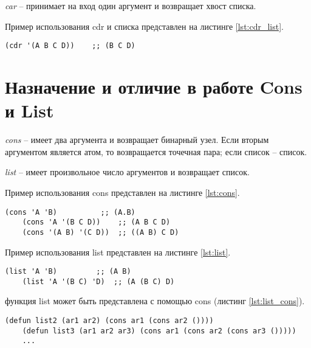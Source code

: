 \textit{car} -- принимает на вход один аргумент и возвращает хвост списка.

Пример использования cdr и списка представлен на листинге \ref{lst:cdr_list}. 

\begin{lstlisting}[label=lst:cdr_list, caption=Использование cdr и списка.]
	(cdr '(A B C D))    ;; (B C D)
\end{lstlisting}

\section{Назначение и отличие в работе Cons и List}
\textit{cons} -- имеет два аргумента и возвращает бинарный узел. Если вторым аргументом является атом, то возвращается точечная пара; если список -- список.

\textit{list} -- имеет произвольное число аргументов и возвращает список.

Пример использования cons представлен на листинге \ref{lst:cons}.
\begin{lstlisting}[label=lst:cons, caption=Использование cons.]
	(cons 'A 'B)          ;; (A.B)
	(cons 'A '(B C D))    ;; (A B C D)
	(cons '(A B) '(C D))  ;; ((A B) C D) 
\end{lstlisting}

Пример использования list представлен на листинге \ref{lst:list}.
\begin{lstlisting}[label=lst:list, caption=Использование list.]
	(list 'A 'B)         ;; (A B)
	(list 'A '(B C) 'D)  ;; (A (B C) D)
\end{lstlisting}

функция list может быть представлена с помощью cons (листинг \ref{lst:list_cons}).

\begin{lstlisting}[label=lst:list_cons, caption=Представление list с помощью cons.]
	(defun list2 (ar1 ar2) (cons ar1 (cons ar2 ())))
	(defun list3 (ar1 ar2 ar3) (cons ar1 (cons ar2 (cons ar3 ()))))
	...
\end{lstlisting}

